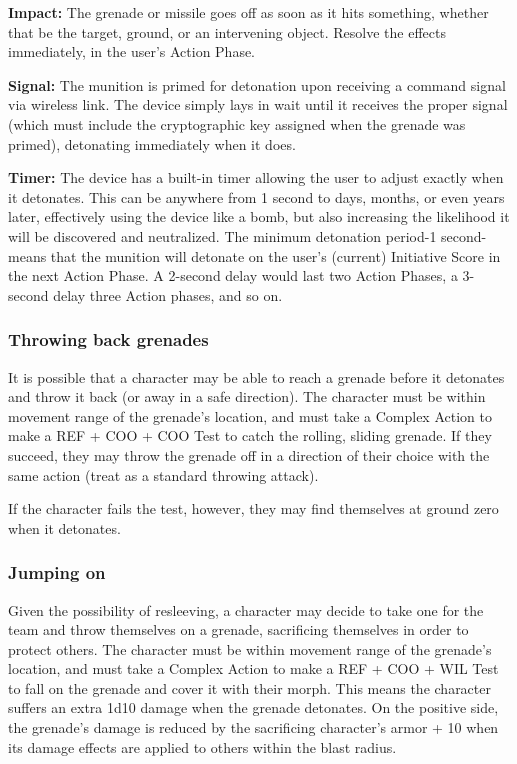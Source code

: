 \textbf{Impact:} The grenade or missile goes off as soon as it hits something, whether that be the target, ground, or an intervening object. Resolve the effects immediately, in the user’s Action Phase. 

\textbf{Signal:} The munition is primed for detonation upon receiving a command signal via wireless link. The device simply lays in wait until it receives the proper signal (which must include the cryptographic key assigned when the grenade was primed), detonating immediately when it does. 

\textbf{Timer:} The device has a built-in timer allowing the user to adjust exactly when it detonates. This can be anywhere from 1 second to days, months, or even years later, effectively using the device like a bomb, but also increasing the likelihood it will be discovered and neutralized. The minimum detonation period-1 second-means that the munition will detonate on the user’s (current) Initiative Score in the next Action Phase. A 2-second delay would last two Action Phases, a 3-second delay three Action phases, and so on. 

\subsubsection{Throwing back grenades} 

It is possible that a character may be able to reach a grenade before it detonates and throw it back (or away in a safe direction). The character must be within movement range of the grenade’s location, and must take a Complex Action to make a REF + COO + COO Test to catch the rolling, sliding grenade. If they succeed, they may throw the grenade off in a direction of their choice with the same action (treat as a standard throwing attack). 

If the character fails the test, however, they may find themselves at ground zero when it detonates. 

\subsubsection{Jumping on} 

Given the possibility of resleeving, a character may decide to take one for the team and throw themselves on a grenade, sacrificing themselves in order to protect others. The character must be within movement range of the grenade’s location, and must take a Complex Action to make a REF + COO + WIL Test to fall on the grenade and cover it with their morph. This means the character suffers an extra 1d10 damage when the grenade detonates. On the positive side, the grenade’s damage is reduced by the sacrificing character’s armor + 10 when its damage effects are applied to others within the blast radius. 

